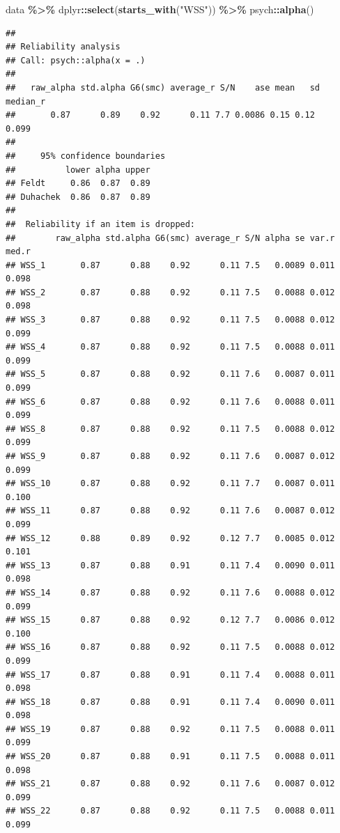 \documentclass[
]{article}
\newenvironment{Shaded}{\begin{snugshade}}{\end{snugshade}}
\newcommand{\FunctionTok}[1]{\textcolor[rgb]{0.13,0.29,0.53}{\textbf{#1}}}
\newcommand{\NormalTok}[1]{#1}
\newcommand{\SpecialCharTok}[1]{\textcolor[rgb]{0.81,0.36,0.00}{\textbf{#1}}}
\newcommand{\StringTok}[1]{\textcolor[rgb]{0.31,0.60,0.02}{#1}}
\begin{document}
\begin{Shaded}
\begin{Highlighting}[]
\NormalTok{data }\SpecialCharTok{\%\textgreater{}\%}\NormalTok{ dplyr}\SpecialCharTok{::}\FunctionTok{select}\NormalTok{(}\FunctionTok{starts\_with}\NormalTok{(}\StringTok{"WSS"}\NormalTok{)) }\SpecialCharTok{\%\textgreater{}\%}\NormalTok{ psych}\SpecialCharTok{::}\FunctionTok{alpha}\NormalTok{()}
\end{Highlighting}
\end{Shaded}

\begin{verbatim}
## 
## Reliability analysis   
## Call: psych::alpha(x = .)
## 
##   raw_alpha std.alpha G6(smc) average_r S/N    ase mean   sd median_r
##       0.87      0.89    0.92      0.11 7.7 0.0086 0.15 0.12    0.099
## 
##     95% confidence boundaries 
##          lower alpha upper
## Feldt     0.86  0.87  0.89
## Duhachek  0.86  0.87  0.89
## 
##  Reliability if an item is dropped:
##        raw_alpha std.alpha G6(smc) average_r S/N alpha se var.r med.r
## WSS_1       0.87      0.88    0.92      0.11 7.5   0.0089 0.011 0.098
## WSS_2       0.87      0.88    0.92      0.11 7.5   0.0088 0.012 0.098
## WSS_3       0.87      0.88    0.92      0.11 7.5   0.0088 0.012 0.099
## WSS_4       0.87      0.88    0.92      0.11 7.5   0.0088 0.011 0.099
## WSS_5       0.87      0.88    0.92      0.11 7.6   0.0087 0.011 0.099
## WSS_6       0.87      0.88    0.92      0.11 7.6   0.0088 0.011 0.099
## WSS_8       0.87      0.88    0.92      0.11 7.5   0.0088 0.012 0.099
## WSS_9       0.87      0.88    0.92      0.11 7.6   0.0087 0.012 0.099
## WSS_10      0.87      0.88    0.92      0.11 7.7   0.0087 0.011 0.100
## WSS_11      0.87      0.88    0.92      0.11 7.6   0.0087 0.012 0.099
## WSS_12      0.88      0.89    0.92      0.12 7.7   0.0085 0.012 0.101
## WSS_13      0.87      0.88    0.91      0.11 7.4   0.0090 0.011 0.098
## WSS_14      0.87      0.88    0.92      0.11 7.6   0.0088 0.012 0.099
## WSS_15      0.87      0.88    0.92      0.12 7.7   0.0086 0.012 0.100
## WSS_16      0.87      0.88    0.92      0.11 7.5   0.0088 0.012 0.099
## WSS_17      0.87      0.88    0.91      0.11 7.4   0.0088 0.011 0.098
## WSS_18      0.87      0.88    0.91      0.11 7.4   0.0090 0.011 0.098
## WSS_19      0.87      0.88    0.92      0.11 7.5   0.0088 0.011 0.099
## WSS_20      0.87      0.88    0.91      0.11 7.5   0.0088 0.011 0.098
## WSS_21      0.87      0.88    0.92      0.11 7.6   0.0087 0.012 0.099
## WSS_22      0.87      0.88    0.92      0.11 7.5   0.0088 0.011 0.099

\end{verbatim}
\end{document}
